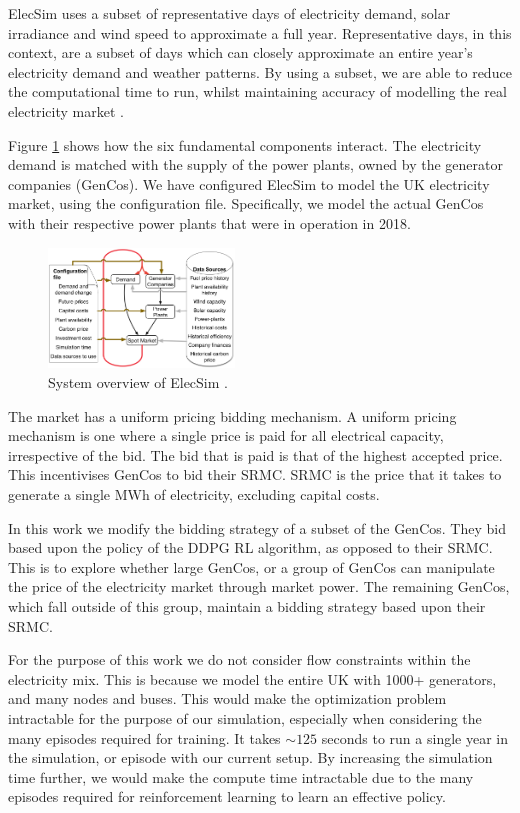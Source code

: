 \documentclass[conference]{IEEEtran}
\begin{document}
ElecSim uses a subset of representative days of electricity demand, solar irradiance and wind speed to approximate a full year. Representative days, in this context, are a subset of days which can closely approximate an entire year's electricity demand and weather patterns. By using a subset, we are able to reduce the computational time to run, whilst maintaining accuracy of modelling the real electricity market \cite{Kell2020}.

Figure \ref{fig:model_details} shows how the six fundamental components interact. The electricity demand is matched with the supply of the power plants, owned by the generator companies (GenCos). We have configured ElecSim to model the UK electricity market, using the configuration file. Specifically, we model the actual GenCos with their respective power plants that were in operation in 2018.



\begin{figure}
    \includegraphics[width=0.44\textwidth]{figures/methedology/System_overview_large.png}
    \caption{System overview of ElecSim \cite{Kell}.}
    \label{fig:model_details}
\end{figure}

The market has a uniform pricing bidding mechanism. A uniform pricing mechanism is one where a single price is paid for all electrical capacity, irrespective of the bid. The bid that is paid is that of the highest accepted price. This incentivises GenCos to bid their SRMC. SRMC is the price that it takes to generate a single MWh of electricity, excluding capital costs. 

In this work we modify the bidding strategy of a subset of the GenCos. They bid based upon the policy of the DDPG RL algorithm, as opposed to their SRMC. This is to explore whether large GenCos, or a group of GenCos can manipulate the price of the electricity market through market power. The remaining GenCos, which fall outside of this group, maintain a bidding strategy based upon their SRMC.

For the purpose of this work we do not consider flow constraints within the electricity mix. This is because we model the entire UK with 1000+ generators, and many nodes and buses. This would make the optimization problem intractable for the purpose of our simulation, especially when considering the many episodes required for training. It takes ${\sim}125$ seconds to run a single year in the simulation, or episode with our current setup. By increasing the simulation time further, we would make the compute time intractable due to the many episodes required for reinforcement learning to learn an effective policy.
\end{document}
